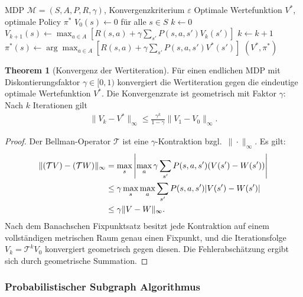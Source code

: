 ﻿\documentclass[a4paper,12pt]{article}
\theoremstyle{definition}
\newtheorem{theorem}{Theorem}[section]
\begin{document}
\begin{algorithm}[H]
  \caption{Wertiteration für MDPs}
  \begin{algorithmic}[1]
    \Eingabe MDP $\mathcal{M} = (S, A, P, R, \gamma)$, Konvergenzkriterium $\varepsilon$
    \Ausgabe Optimale Wertefunktion $V^*$, optimale Policy $\pi^*$
      \State $V_0(s) \gets 0$ für alle $s \in S$
      \State $k \gets 0$
      \Wiederhole
          \State $V_{k+1}(s) \gets \max_{a \in A} \left[ R(s,a) + \gamma \sum_{s'} P(s,a,s') V_k(s') \right]$
        \EndeFuer
        \State $k \gets k + 1$
      \State $\pi^*(s) \gets \arg\max_{a \in A} \left[ R(s,a) + \gamma \sum_{s'} P(s,a,s') V^*(s') \right]$
      \State \Return $(V^*, \pi^*)$
    \EndProzedur
  \end{algorithmic}
\end{algorithm}

\begin{theorem}[Konvergenz der Wertiteration]
Für einen endlichen MDP mit Diskontierungsfaktor $\gamma \in [0,1)$ konvergiert die Wertiteration gegen die eindeutige optimale Wertefunktion $V^*$. Die Konvergenzrate ist geometrisch mit Faktor $\gamma$: Nach $k$ Iterationen gilt
\begin{align}
  \|V_k - V^*\|_\infty \leq \frac{\gamma^k}{1-\gamma} \|V_1 - V_0\|_\infty.
\end{align}
\end{theorem}

\begin{proof}
Der Bellman-Operator $\mathcal{T}$ ist eine $\gamma$-Kontraktion bzgl.\ $\|\cdot\|_\infty$. Es gilt:
\begin{align}
  \|(\mathcal{T} V) - (\mathcal{T} W)\|_\infty &= \max_s \left|\max_a \gamma \sum_{s'} P(s,a,s')(V(s') - W(s'))\right| \\
  &\leq \gamma \max_s \max_a \sum_{s'} P(s,a,s') |V(s') - W(s')| \notag \\
  &\leq \gamma \|V - W\|_\infty. \notag
\end{align}
Nach dem Banachschen Fixpunktsatz besitzt jede Kontraktion auf einem vollständigen metrischen Raum genau einen Fixpunkt, und die Iterationsfolge $V_k = \mathcal{T}^k V_0$ konvergiert geometrisch gegen diesen. Die Fehlerabschätzung ergibt sich durch geometrische Summation.
\end{proof}

\subsubsection{Probabilistischer Subgraph Algorithmus}
\end{document}

